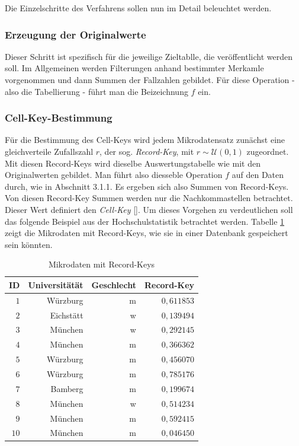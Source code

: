 Die Einzelschritte des Verfahrens sollen nun im Detail beleuchtet werden.

\subsubsection{Erzeugung der Originalwerte}

Dieser Schritt ist spezifisch für die jeweilige Zieltablle, die veröffentlicht werden soll. Im Allgemeinen werden Filterungen anhand bestimmter Merkamle vorgenommen und dann Summen der Fallzahlen gebildet. Für diese Operation - also die Tabellierung - führt man die Beizeichnung $f$ ein.

\subsubsection{Cell-Key-Bestimmung}

Für die Bestimmung des Cell-Keys wird jedem Mikrodatensatz zunächst eine gleichverteile Zufallszahl $r$, der sog. \textit{Record-Key}, mit $r \sim \mathcal{U}(0, 1)$ zugeordnet. Mit diesen Record-Keys wird dieselbe Auswertungstabelle wie mit den Originalwerten gebildet. Man führt also diesseble  Operation $f$ auf den Daten durch, wie in Abschnitt 3.1.1. Es ergeben sich also Summen von Record-Keys. Von diesen Record-Key Summen werden nur die Nachkommastellen betrachtet. Dieser Wert definiert den \textit{Cell-Key} [\cite{Enderle}]. Um dieses Vorgehen zu verdeutlichen soll das folgende Beispiel aus der Hochschulstatistik betrachtet werden. Tabelle \ref{tab_mikrodaten} zeigt die Mikrodaten mit Record-Keys, wie sie in einer Datenbank gespeichert sein könnten.

\begin{table}[h]
    \centering
    \begin{tabular}{ r r r r }
        \textbf{ID} \vline & \textbf{Universitätät} & \textbf{Geschlecht} & \textbf{Record-Key} \\ 
        \hline
        $1$ \vline & Würzburg & m & $0,611853$ \\
        $2$ \vline & Eichstätt & w & $0,139494$ \\
        $3$ \vline & München & w & $0,292145$ \\
        $4$ \vline & München & m & $0,366362$ \\
        $5$ \vline & Würzburg & m & $0,456070$ \\
        $6$ \vline & Würzburg & m & $0,785176$ \\
        $7$ \vline & Bamberg & m & $0,199674$ \\
        $8$ \vline & München & w & $0,514234$ \\
        $9$ \vline & München & m & $0,592415$ \\
        $10$ \vline & München & m & $0,046450$
    \end{tabular}
    \caption{Mikrodaten mit Record-Keys}
    \label{tab_mikrodaten}
\end{table}

